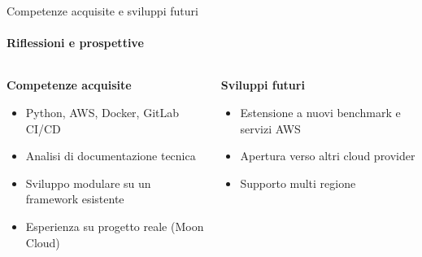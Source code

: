 \documentclass{beamer}
\begin{document}
\begin{frame}{Competenze acquisite e sviluppi futuri}
    \framesubtitle{Riflessioni e prospettive}
    \begin{columns}
        \begin{column}{0.5\textwidth}
            \textbf{Competenze acquisite}
            \begin{itemize}
                \item Python, AWS, Docker, GitLab CI/CD                \item Analisi di documentazione tecnica
                \item Sviluppo modulare su un framework esistente
                \item Esperienza su progetto reale (Moon Cloud)
            \end{itemize}
        \end{column}
        \begin{column}{0.5\textwidth}
            \textbf{Sviluppi futuri}
            \begin{itemize}
                \item Estensione a nuovi benchmark e servizi AWS
                \item Apertura verso altri cloud provider
                \item Supporto multi regione
            \end{itemize}
        \end{column}
    \end{columns}
\end{frame}




\backmatter
\end{document}
